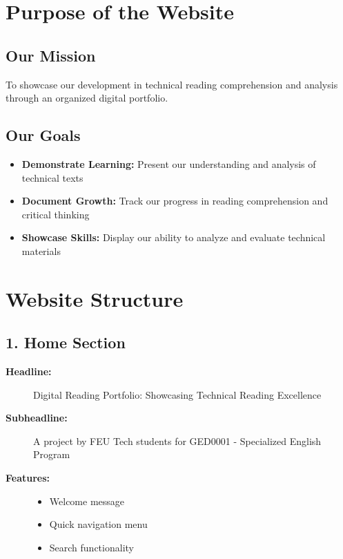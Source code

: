 \documentclass{article}
\begin{document}
\section*{Purpose of the Website}
\subsection*{Our Mission}
To showcase our development in technical reading comprehension and analysis through an organized digital portfolio.

\subsection*{Our Goals}
\begin{itemize}[leftmargin=*]
    \item \textbf{Demonstrate Learning:} Present our understanding and analysis of technical texts
    \item \textbf{Document Growth:} Track our progress in reading comprehension and critical thinking
    \item \textbf{Showcase Skills:} Display our ability to analyze and evaluate technical materials
\end{itemize}

\section*{Website Structure}
\subsection*{1. Home Section}
\begin{description}
    \item[\textbf{Headline:}] 
    Digital Reading Portfolio: Showcasing Technical Reading Excellence
    \item[\textbf{Subheadline:}] 
    A project by FEU Tech students for GED0001 - Specialized English Program
    \item[\textbf{Features:}]
    \begin{itemize}[label={--}]
        \item Welcome message
        \item Quick navigation menu
        \item Search functionality
    \end{itemize}
\end{description}
\end{document}
